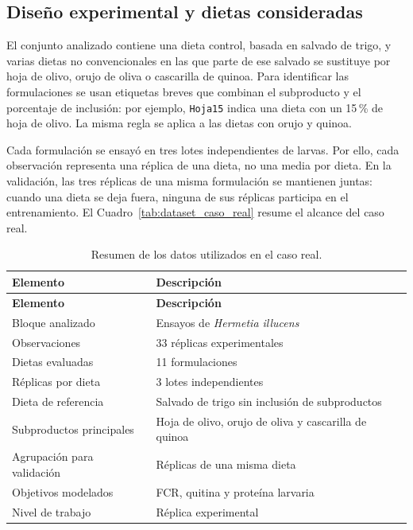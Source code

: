 \subsection{Diseño experimental y dietas consideradas}\label{subsec:diseno_dietas_caso_real}

El conjunto analizado contiene una dieta control, basada en salvado de trigo, y varias dietas no convencionales en las que parte de ese salvado se sustituye por hoja de olivo, orujo de oliva o cascarilla de quinoa. Para identificar las formulaciones se usan etiquetas breves que combinan el subproducto y el porcentaje de inclusión: por ejemplo, \texttt{Hoja15} indica una dieta con un 15 \% de hoja de olivo. La misma regla se aplica a las dietas con orujo y quinoa.

Cada formulación se ensayó en tres lotes independientes de larvas. Por ello, cada observación representa una réplica de una dieta, no una media por dieta. En la validación, las tres réplicas de una misma formulación se mantienen juntas: cuando una dieta se deja fuera, ninguna de sus réplicas participa en el entrenamiento. El Cuadro~\ref{tab:dataset_caso_real} resume el alcance del caso real.

\protect{}\label{tab:dataset_caso_real}
\begin{longtable}[]{@{}ll@{}}
\caption{Resumen de los datos utilizados en el caso real.}\tabularnewline
\toprule\noalign{}
\textbf{Elemento} & \textbf{Descripción} \\
\midrule\noalign{}
\endfirsthead
\toprule\noalign{}
\textbf{Elemento} & \textbf{Descripción} \\
\midrule\noalign{}
\endhead
\bottomrule\noalign{}
\endlastfoot
Bloque analizado & Ensayos de \emph{Hermetia illucens} \\
Observaciones & 33 réplicas experimentales \\
Dietas evaluadas & 11 formulaciones \\
Réplicas por dieta & 3 lotes independientes \\
Dieta de referencia & Salvado de trigo sin inclusión de subproductos \\
Subproductos principales & Hoja de olivo, orujo de oliva y cascarilla de quinoa \\
Agrupación para validación & Réplicas de una misma dieta \\
Objetivos modelados & FCR, quitina y proteína larvaria \\
Nivel de trabajo & Réplica experimental \\
\end{longtable}

